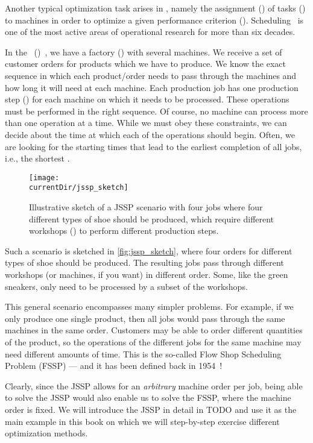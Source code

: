 %
%
\label{sec:jsspExample}%
%
Another typical optimization task arises in , namely the assignment () of tasks () to machines in order to optimize a given performance criterion ().
Scheduling~\cite{P2016STAAS,PS2009FYOSASOM} is one of the most active areas of operational research for more than  six decades.

In the \emph{}~()~\cite{CGLL1995STAIA,GLLRK1979OAAIDSASAS,LLRKS1993SASAAC,L1982RRITTOMS,T1993BFBSP,BDP1996TJSSPCANST}, we have a factory () with several machines.
We receive a set of customer orders for products which we have to produce.
We know the exact sequence in which each product/order needs to pass through the machines and how long it will need at each machine.
Each production job has one production step () for each machine on which it needs to be processed.
These operations must be performed in the right sequence.
Of course, no machine can process more than one operation at a time.
While we must obey these constraints, we can decide about the time at which each of the operations should begin.
Often, we are looking for the starting times that lead to the earliest completion of all jobs, i.e., the shortest .

\begin{figure}%
\centering%
\texttt{[image: \\currentDir/jssp\_sketch]}%
\caption{Illustrative sketch of a JSSP scenario with four jobs where four different types of shoe should be produced, which require different workshops () to perform different production steps.}%
\label{fig:jssp_sketch}%
\end{figure}%
%
Such a scenario is sketched in \autoref{fig:jssp_sketch}, where four orders for different types of shoe should be produced.
The resulting jobs pass through different workshops (or machines, if you want) in different order.
Some, like the green sneakers, only need to be processed by a subset of the workshops.

This general scenario encompasses many simpler problems.
For example, if we only produce one single product, then all jobs would pass through the same machines in the same order.
Customers may be able to order different quantities of the product, so the operations of the different jobs for the same machine may need different amounts of time.
This is the so-called Flow Shop Scheduling Problem (FSSP) --- and it has been defined back in 1954~\cite{J1954OTATSPSWSTI}!

Clearly, since the JSSP allows for an \emph{arbitrary} machine order per job, being able to solve the JSSP would also enable us to solve the FSSP, where the machine order is fixed.
We will introduce the JSSP in detail in TODO and use it as the main example in this book on which we will step-by-step exercise different optimization methods.%
\endhsection%
%

